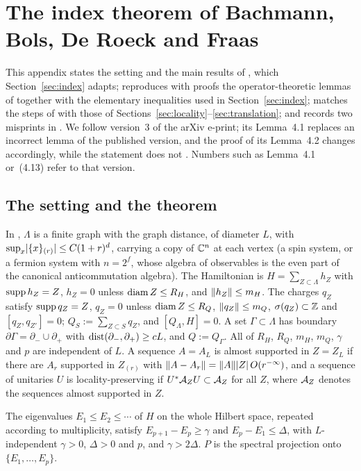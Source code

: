 \section{The index theorem of Bachmann, Bols, De Roeck and Fraas}\label{app:bbdf}

This appendix states the setting and the main results of \cite{BBDF21}, which Section~\ref{sec:index} adapts;
reproduces with proofs the operator-theoretic lemmas of \cite[Section~4.1]{BBDF21} together with the elementary
inequalities used in Section~\ref{sec:index}; matches the steps of \cite{BBDF21} with those of
Sections~\ref{sec:locality}--\ref{sec:translation}; and records two misprints in \cite[Section~4.2]{BBDF21}. We follow
version~3 of the arXiv e-print; its Lemma~4.1 replaces an incorrect lemma of the published version, and the proof of
its Lemma~4.2 changes accordingly, while the statement does not \cite[Section~4.1]{BBDF21}. Numbers such as Lemma~4.1
or~(4.13) refer to that version.

\subsection{The setting and the theorem}

In \cite[Sections~2--3]{BBDF21}, $\Lambda$ is a finite graph with the graph distance, of diameter $L$, with
$\sup_x\lvert\{x\}_{(r)}\rvert\le C(1+r)^d$, carrying a copy of $\mathbb{C}^n$ at each vertex (a spin system, or a fermion system
with $n=2^f$, whose algebra of observables is the even part of the canonical anticommutation algebra). The
Hamiltonian is $H=\sum_{Z\subset\Lambda}h_Z$ with $\operatorname{supp} h_Z=Z$, $h_Z=0$ unless $\operatorname{diam} Z\le R_H$, and $\lVert h_Z\rVert\le m_H$.
The charges $q_Z$ satisfy $\operatorname{supp} q_Z=Z$, $q_Z=0$ unless $\operatorname{diam} Z\le R_Q$, $\lVert q_Z\rVert\le m_Q$, $\sigma(q_Z)\subset\mathbb{Z}$ and
$[q_Z,q_{Z'}]=0$; $Q_S:=\sum_{Z\subset S}q_Z$, and $[Q_\Lambda,H]=0$. A set $\Gamma\subset\Lambda$ has boundary
$\partial\Gamma=\partial_-\cup\partial_+$ with $\operatorname{dist}(\partial_-,\partial_+)\ge cL$, and $Q:=Q_\Gamma$. All of $R_H$, $R_Q$, $m_H$,
$m_Q$, $\gamma$ and $p$ are independent of $L$. A sequence $A=A_L$ is almost supported in $Z=Z_L$ if there are
$A_r$ supported in $Z_{(r)}$ with $\lVert A-A_r\rVert=\lVert A\rVert\lvert Z\rvert\,O(r^{-\infty})$, and a sequence of unitaries $U$ is
locality-preserving if $U^*\mathcal{A}_ZU\subset\mathcal{A}_Z$ for all $Z$, where $\mathcal{A}_Z$ denotes the sequences almost supported in $Z$.

\begin{assumption}\label{ass:bbdf-gap}
The eigenvalues $E_1\le E_2\le\cdots$ of $H$ on the whole Hilbert space, repeated according to multiplicity,
satisfy $E_{p+1}-E_p\ge\gamma$ and $E_p-E_1\le\Delta$, with $L$-independent $\gamma>0$, $\Delta>0$ and $p$, and $\gamma>2\Delta$.
$P$ is the spectral projection onto $\{E_1,\dots,E_p\}$.
\end{assumption}

